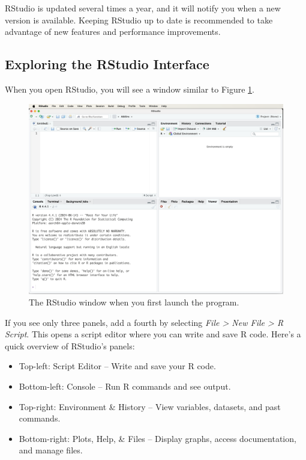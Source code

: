 \documentclass[
]{book}
\providecommand{\tightlist}{%
  \setlength{\itemsep}{0pt}\setlength{\parskip}{0pt}}
\theoremstyle{definition}
\theoremstyle{definition}
\theoremstyle{definition}
\theoremstyle{definition}
\theoremstyle{remark}
\begin{document}
RStudio is updated several times a year, and it will notify you when a new version is available. Keeping RStudio up to date is recommended to take advantage of new features and performance improvements.

\subsection*{Exploring the RStudio Interface}\label{exploring-the-rstudio-interface}

When you open RStudio, you will see a window similar to Figure \ref{fig:RStudio-window-1}.

\begin{figure}

{\centering \includegraphics[width=0.7\linewidth]{images/RStudio-window-1} 

}

\caption{The RStudio window when you first launch the program.}\label{fig:RStudio-window-1}
\end{figure}

If you see only three panels, add a fourth by selecting \emph{File \textgreater{} New File \textgreater{} R Script}. This opens a script editor where you can write and save R code. Here's a quick overview of RStudio's panels:

\begin{itemize}
\tightlist
\item
  Top-left: Script Editor -- Write and save your R code.\\
\item
  Bottom-left: Console -- Run R commands and see output.\\
\item
  Top-right: Environment \& History -- View variables, datasets, and past commands.\\
\item
  Bottom-right: Plots, Help, \& Files -- Display graphs, access documentation, and manage files.
\end{itemize}
\end{document}
